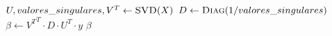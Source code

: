     \State $U, valores\_singulares, V^T \gets \Call{SVD}{X}$
    \State $D \gets \Call{Diag}{1/valores\_singulares}$
    \State $\beta \gets {V^T}^T \cdot {D} \cdot {U}^T \cdot {y}$
    \State \Return $\beta$
\EndFunction